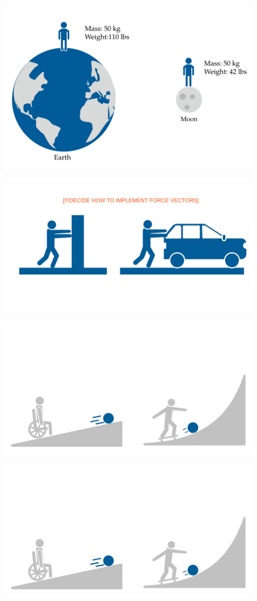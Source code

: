 \includegraphics[width=1\textwidth]{testimage_Mass weight.png}

\includegraphics[width=1\textwidth]{testimage_Moving car.png}

\includegraphics[width=1\textwidth]{testimage_Ramps.png}

\includegraphics[width=1\textwidth]{testimage_Ramps.png}

